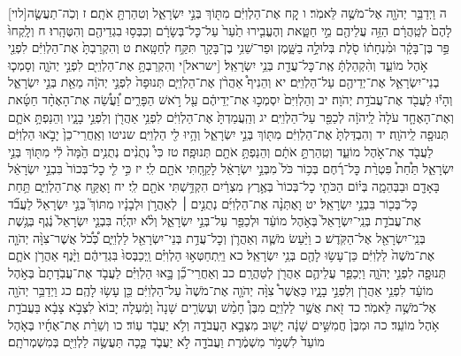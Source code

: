 \documentclass[twoside, openany, parskip=half, 11pt]{book}
\begin{document}
[לוי]ה וַיְדַבֵּ֥ר יְהֹוָ֖ה אֶל־מֹשֶׁ֥ה לֵּאמֹֽר׃ ו קַ֚ח אֶת־הַלְוִיִּ֔ם מִתּ֖וֹךְ בְּנֵ֣י יִשְׂרָאֵ֑ל וְטִהַרְתָּ֖ אֹתָֽם׃ ז וְכֹֽה־תַעֲשֶׂ֤ה לָהֶם֙ לְטַֽהֲרָ֔ם הַזֵּ֥ה עֲלֵיהֶ֖ם מֵ֣י חַטָּ֑את וְהֶעֱבִ֤ירוּ תַ֙עַר֙ עַל־כׇּל־בְּשָׂרָ֔ם וְכִבְּס֥וּ בִגְדֵיהֶ֖ם וְהִטֶּהָֽרוּ׃ ח וְלָֽקְחוּ֙ פַּ֣ר בֶּן־בָּקָ֔ר וּמִ֨נְחָת֔וֹ סֹ֖לֶת בְּלוּלָ֣ה בַשָּׁ֑מֶן וּפַר־שֵׁנִ֥י בֶן־בָּקָ֖ר תִּקַּ֥ח לְחַטָּֽאת׃ ט וְהִקְרַבְתָּ֙ אֶת־הַלְוִיִּ֔ם לִפְנֵ֖י אֹ֣הֶל מוֹעֵ֑ד וְהִ֨קְהַלְתָּ֔ אֶֽת־כׇּל־עֲדַ֖ת בְּנֵ֥י יִשְׂרָאֵֽל׃ [ישראל]י וְהִקְרַבְתָּ֥ אֶת־הַלְוִיִּ֖ם לִפְנֵ֣י יְהֹוָ֑ה וְסָמְכ֧וּ בְנֵי־יִשְׂרָאֵ֛ל אֶת־יְדֵיהֶ֖ם עַל־הַלְוִיִּֽם׃ יא וְהֵנִיף֩ אַהֲרֹ֨ן אֶת־הַלְוִיִּ֤ם תְּנוּפָה֙ לִפְנֵ֣י יְהֹוָ֔ה מֵאֵ֖ת בְּנֵ֣י יִשְׂרָאֵ֑ל וְהָי֕וּ לַעֲבֹ֖ד אֶת־עֲבֹדַ֥ת יְהֹוָה׃ יב וְהַלְוִיִּם֙ יִסְמְכ֣וּ אֶת־יְדֵיהֶ֔ם עַ֖ל רֹ֣אשׁ הַפָּרִ֑ים וַ֠עֲשֵׂ֠ה אֶת־הָאֶחָ֨ד חַטָּ֜את וְאֶת־הָאֶחָ֤ד עֹלָה֙ לַֽיהֹוָ֔ה לְכַפֵּ֖ר עַל־הַלְוִיִּֽם׃ יג וְהַֽעֲמַדְתָּ֙ אֶת־הַלְוִיִּ֔ם לִפְנֵ֥י אַהֲרֹ֖ן וְלִפְנֵ֣י בָנָ֑יו וְהֵנַפְתָּ֥ אֹתָ֛ם תְּנוּפָ֖ה לַֽיהֹוָֽה׃ יד וְהִבְדַּלְתָּ֙ אֶת־הַלְוִיִּ֔ם מִתּ֖וֹךְ בְּנֵ֣י יִשְׂרָאֵ֑ל וְהָ֥יוּ לִ֖י הַלְוִיִּֽם׃ שניטו וְאַֽחֲרֵי־כֵן֙ יָבֹ֣אוּ הַלְוִיִּ֔ם לַעֲבֹ֖ד אֶת־אֹ֣הֶל מוֹעֵ֑ד וְטִֽהַרְתָּ֣ אֹתָ֔ם וְהֵנַפְתָּ֥ אֹתָ֖ם תְּנוּפָֽה׃ טז כִּי֩ נְתֻנִ֨ים נְתֻנִ֥ים הֵ֙מָּה֙ לִ֔י מִתּ֖וֹךְ בְּנֵ֣י יִשְׂרָאֵ֑ל תַּ֩חַת֩ פִּטְרַ֨ת כׇּל־רֶ֜חֶם בְּכ֥וֹר כֹּל֙ מִבְּנֵ֣י יִשְׂרָאֵ֔ל לָקַ֥חְתִּי אֹתָ֖ם לִֽי׃ יז כִּ֣י לִ֤י כׇל־בְּכוֹר֙ בִּבְנֵ֣י יִשְׂרָאֵ֔ל בָּאָדָ֖ם וּבַבְּהֵמָ֑ה בְּי֗וֹם הַכֹּתִ֤י כׇל־בְּכוֹר֙ בְּאֶ֣רֶץ מִצְרַ֔יִם הִקְדַּ֥שְׁתִּי אֹתָ֖ם לִֽי׃ יח וָאֶקַּ֖ח אֶת־הַלְוִיִּ֑ם תַּ֥חַת כׇּל־בְּכ֖וֹר בִּבְנֵ֥י יִשְׂרָאֵֽל׃ יט וָאֶתְּנָ֨ה אֶת־הַלְוִיִּ֜ם נְתֻנִ֣ים ׀ לְאַהֲרֹ֣ן וּלְבָנָ֗יו מִתּוֹךְ֮ בְּנֵ֣י יִשְׂרָאֵל֒ לַעֲבֹ֞ד אֶת־עֲבֹדַ֤ת בְּנֵֽי־יִשְׂרָאֵל֙ בְּאֹ֣הֶל מוֹעֵ֔ד וּלְכַפֵּ֖ר עַל־בְּנֵ֣י יִשְׂרָאֵ֑ל וְלֹ֨א יִהְיֶ֜ה בִּבְנֵ֤י יִשְׂרָאֵל֙ נֶ֔גֶף בְּגֶ֥שֶׁת בְּנֵֽי־יִשְׂרָאֵ֖ל אֶל־הַקֹּֽדֶשׁ׃ כ וַיַּ֨עַשׂ מֹשֶׁ֧ה וְאַהֲרֹ֛ן וְכׇל־עֲדַ֥ת בְּנֵי־יִשְׂרָאֵ֖ל לַלְוִיִּ֑ם כְּ֠כֹ֠ל אֲשֶׁר־צִוָּ֨ה יְהֹוָ֤ה אֶת־מֹשֶׁה֙ לַלְוִיִּ֔ם כֵּן־עָשׂ֥וּ לָהֶ֖ם בְּנֵ֥י יִשְׂרָאֵֽל׃ כא וַיִּֽתְחַטְּא֣וּ הַלְוִיִּ֗ם וַֽיְכַבְּסוּ֙ בִּגְדֵיהֶ֔ם וַיָּ֨נֶף אַהֲרֹ֥ן אֹתָ֛ם תְּנוּפָ֖ה לִפְנֵ֣י יְהֹוָ֑ה וַיְכַפֵּ֧ר עֲלֵיהֶ֛ם אַהֲרֹ֖ן לְטַהֲרָֽם׃ כב וְאַחֲרֵי־כֵ֞ן בָּ֣אוּ הַלְוִיִּ֗ם לַעֲבֹ֤ד אֶת־עֲבֹֽדָתָם֙ בְּאֹ֣הֶל מוֹעֵ֔ד לִפְנֵ֥י אַהֲרֹ֖ן וְלִפְנֵ֣י בָנָ֑יו כַּאֲשֶׁר֩ צִוָּ֨ה יְהֹוָ֤ה אֶת־מֹשֶׁה֙ עַל־הַלְוִיִּ֔ם כֵּ֖ן עָשׂ֥וּ לָהֶֽם׃
כג וַיְדַבֵּ֥ר יְהֹוָ֖ה אֶל־מֹשֶׁ֥ה לֵּאמֹֽר׃ כד זֹ֖את אֲשֶׁ֣ר לַלְוִיִּ֑ם מִבֶּן֩ חָמֵ֨שׁ וְעֶשְׂרִ֤ים שָׁנָה֙ וָמַ֔עְלָה יָבוֹא֙ לִצְבֹ֣א צָבָ֔א בַּעֲבֹדַ֖ת אֹ֥הֶל מוֹעֵֽד׃ כה וּמִבֶּן֙ חֲמִשִּׁ֣ים שָׁנָ֔ה יָשׁ֖וּב מִצְּבָ֣א הָעֲבֹדָ֑ה וְלֹ֥א יַעֲבֹ֖ד עֽוֹד׃ כו וְשֵׁרֵ֨ת אֶת־אֶחָ֜יו בְּאֹ֤הֶל מוֹעֵד֙ לִשְׁמֹ֣ר מִשְׁמֶ֔רֶת וַעֲבֹדָ֖ה לֹ֣א יַעֲבֹ֑ד כָּ֛כָה תַּעֲשֶׂ֥ה לַלְוִיִּ֖ם בְּמִשְׁמְרֹתָֽם׃
\end{document}
